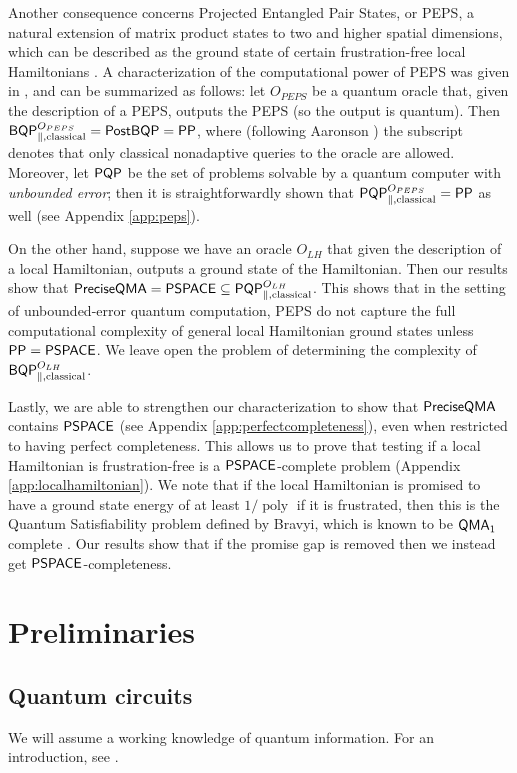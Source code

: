 \documentclass[a4paper,UKenglish]{lipics-v2016}
\newcommand\QMA{{\sf{QMA}}}
\newcommand\PSPACE{{\sf{PSPACE}}}
\newcommand\PP{\sf{PP}}
\newcommand\BQP{{\sf{BQP}}}
\newcommand\PostBQP{{\sf{PostBQP}}}
\newcommand\PQP{{\sf{PQP}}}
\newcommand\preciseQMA{{\sf{PreciseQMA}}}
\DeclareMathOperator{\poly}{poly}
\begin{document}
Another consequence concerns Projected Entangled Pair States, or PEPS, a natural extension of matrix product states to two and higher spatial dimensions, which can be described as the ground state of certain frustration-free local Hamiltonians \cite{vc04}. A characterization of the computational power of PEPS was given in \cite{swv07}, and can be summarized as follows: let $O_{PEPS}$ be a quantum oracle that, given the description of a PEPS, outputs the PEPS (so the output is quantum). Then $\BQP^{O_{PEPS}}_{\parallel,\text{classical}} = \PostBQP = \PP$, where (following Aaronson \cite{aaronson05}) the subscript  denotes that only classical nonadaptive queries to the oracle are allowed. Moreover, let $\PQP$ be the set of problems solvable by a quantum computer with \emph{unbounded error}; then it is straightforwardly shown that $\PQP^{O_{PEPS}}_{\parallel,\text{classical}} = \PP$ as well (see Appendix \ref{app:peps}).

On the other hand, suppose we have an oracle $O_{LH}$ that given the description of a local Hamiltonian, outputs a ground state of the Hamiltonian. Then our results show that $\preciseQMA = \PSPACE \subseteq \PQP^{O_{LH}}_{\parallel,\text{classical}}$. This shows that in the setting of unbounded-error quantum computation, PEPS do not capture the full computational complexity of general local Hamiltonian ground states unless $\PP=\PSPACE$. We leave open the problem of determining the complexity of $\BQP^{O_{LH}}_{\parallel,\text{classical}}$.

Lastly, we are able to strengthen our characterization to show that $\preciseQMA$ contains $\PSPACE$ (see Appendix \ref{app:perfectcompleteness}), even when restricted to having perfect completeness.  This allows us to prove that testing if a local Hamiltonian is frustration-free is a $\PSPACE$-complete problem (Appendix \ref{app:localhamiltonian}). We note that if the local Hamiltonian is promised to have a ground state energy of at least $1/\poly$ if it is frustrated, then this is the Quantum Satisfiability problem defined by Bravyi, which is known to be $\QMA_1$ complete \cite{bravyi06,gn13}. Our results show that if the promise gap is removed then we instead get $\PSPACE$-completeness.

 \section{Preliminaries}
\subsection{Quantum circuits}
We will assume a working knowledge of quantum information. For an introduction, see \cite{nc00}.
\end{document}
